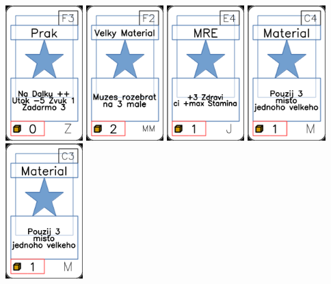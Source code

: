 \documentclass[a4paper]{article}
\begin{document}
	\includegraphics[width=3.0cm]{img-1_87}
	\includegraphics[width=3.0cm]{img-1_56}
	\includegraphics[width=3.0cm]{img-1_23}
	\includegraphics[width=3.0cm]{img-1_43}
	\includegraphics[width=3.0cm]{img-1_42}
\end{document}
